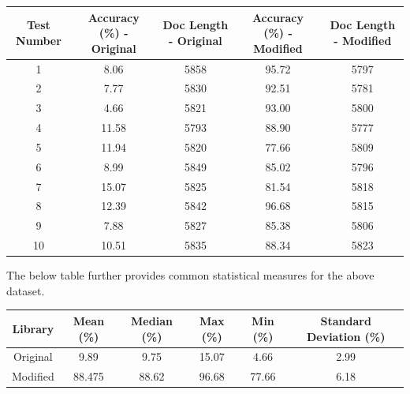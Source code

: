 \documentclass[9pt, titlepage]{article}
\begin{document}
  \begin{center}
    \begin{tabular}{||c c c c c||} 
      \hline
      Test Number & Accuracy (\%) - Original & Doc Length - Original & Accuracy (\%) - Modified & Doc Length - Modified \\ [0.5ex] 
      \hline\hline
      1 &  8.06 & 5858 & 95.72 & 5797 \\ 
      \hline
      2 &  7.77 & 5830 & 92.51 & 5781 \\ 
      \hline
      3 &  4.66 & 5821 & 93.00 & 5800 \\ 
      \hline
      4 & 11.58 & 5793 & 88.90 & 5777 \\ 
      \hline
      5 & 11.94 & 5820 & 77.66 & 5809 \\ 
      \hline
      6 &  8.99 & 5849 & 85.02 & 5796 \\ 
      \hline
      7 & 15.07 & 5825 & 81.54 & 5818 \\ 
      \hline
      8 & 12.39 & 5842 & 96.68 & 5815 \\ 
      \hline
      9 &  7.88 & 5827 & 85.38 & 5806 \\ 
      \hline
      10 & 10.51 & 5835 & 88.34 & 5823 \\ 
      \hline
    \end{tabular}
  \end{center}
  
  The below table further provides common statistical measures for the above dataset.\\

  \begin{center}
    \begin{tabular}{||c c c c c c||} 
      \hline
      Library & Mean (\%) & Median (\%) & Max (\%) & Min (\%) & Standard Deviation (\%) \\ [0.5ex] 
      \hline\hline
      Original & 9.89 & 9.75 & 15.07 & 4.66 & 2.99 \\ 
      \hline
      Modified & 88.475 & 88.62 & 96.68 & 77.66 & 6.18 \\
      \hline
    \end{tabular}
  \end{center}
  \hfill

  \break
\end{document}
